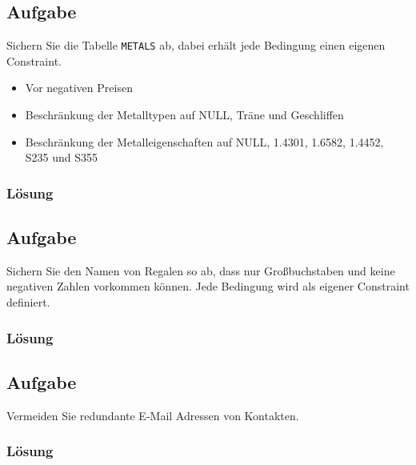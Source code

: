 \subsection{Aufgabe}
\label{sec:uebung_05.aufgabe_04}
Sichern Sie die Tabelle \texttt{METALS} ab, dabei erhält jede Bedingung einen eigenen Constraint.
\begin{itemize}
  \item Vor negativen Preisen
  \item Beschränkung der Metalltypen auf NULL, \glqq{}Träne\grqq{} und \glqq{}Geschliffen\grqq{}
  \item Beschränkung der Metalleigenschaften auf NULL, \glqq{}1.4301\grqq{}, \glqq{}1.6582\grqq{}, \glqq{}1.4452\grqq{}, \glqq{}S235\grqq{} und \glqq{}S355\grqq{}
\end{itemize}

\subsubsection*{Lösung}
\label{sec:uebung_05.aufgabe_04.loesung}

\subsection{Aufgabe}
\label{sec:uebung_05.aufgabe_05}
Sichern Sie den Namen von Regalen so ab, dass nur Großbuchstaben und keine negativen Zahlen vorkommen können. Jede Bedingung wird als eigener Constraint definiert.

\subsubsection*{Lösung}
\label{sec:uebung_05.aufgabe_05.loesung}

\subsection{Aufgabe}
\label{sec:uebung_05.aufgabe_06}
Vermeiden Sie redundante E-Mail Adressen von Kontakten.

\subsubsection*{Lösung}
\label{sec:uebung_05.aufgabe_06.loesung}



